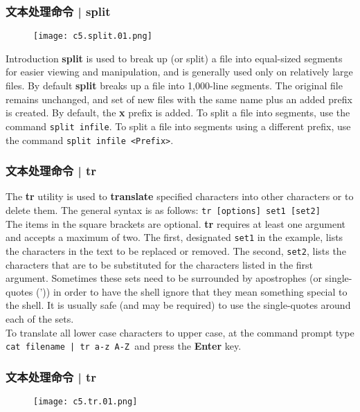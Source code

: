 \begin{frame}[fragile]
  \frametitle{文本处理命令 | split}
  \begin{figure}
    \centering
    \texttt{[image: c5.split.01.png]}
  \end{figure}
  \pause
  \vspace{-0.3cm}
  \begin{block}{Introduction}
    {\footnotesize\textbf{split} is used to break up (or split) a file into equal-sized segments for easier viewing and manipulation, and is generally used only on relatively large files. By default \textbf{split} breaks up a file into 1,000-line segments. The original file remains unchanged, and set of new files with the same name plus an added prefix is created. By default, the \textbf{x} prefix is added. To split a file into segments, use the command \verb|split infile|. To split a file into segments using a different prefix, use the command \verb|split infile <Prefix>|.}
  \end{block}
\end{frame}

\begin{frame}[fragile]
  \frametitle{文本处理命令 | tr}
  The \textbf{tr} utility is used to \textbf{translate} specified characters into other characters or to delete them. The general syntax is as follows: \verb|tr [options] set1 [set2]|\\
  \vspace{0.3cm}
  The items in the square brackets are optional. \textbf{tr} requires at least one argument and accepts a maximum of two. The first, designated \verb|set1| in the example, lists the characters in the text to be replaced or removed. The second, \verb|set2|, lists the characters that are to be substituted for the characters listed in the first argument. Sometimes these sets need to be surrounded by apostrophes (or single-quotes (')) in order to have the shell ignore that they mean something special to the shell. It is usually safe (and may be required) to use the single-quotes around each of the sets.\\
  \vspace{0.3cm}
  To translate all lower case characters to upper case, at the command prompt type \verb=cat filename | tr a-z A-Z =and press the \textbf{Enter} key.
\end{frame}

\begin{frame}
  \frametitle{文本处理命令 | tr}
  \begin{figure}
    \centering
    \texttt{[image: c5.tr.01.png]}
  \end{figure}
\end{frame}

